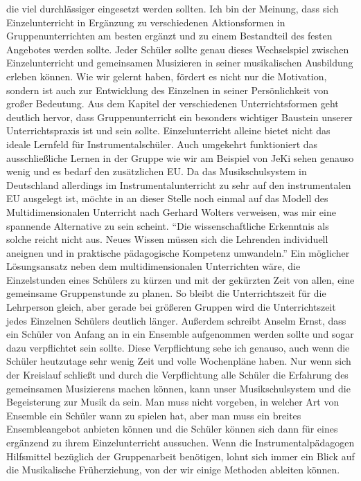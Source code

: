 die viel durchlässiger eingesetzt werden sollten. Ich bin der Meinung, dass sich
Einzelunterricht in Ergänzung zu verschiedenen Aktionsformen in
Gruppenunterrichten am besten ergänzt und zu einem Bestandteil des festen
Angebotes werden sollte. Jeder Schüler sollte genau dieses Wechselspiel zwischen
Einzelunterricht und gemeinsamen Musizieren in seiner musikalischen Ausbildung
erleben können. Wie wir gelernt haben, fördert es nicht nur die Motivation,
sondern ist auch zur Entwicklung des Einzelnen in seiner Persönlichkeit von
großer Bedeutung. Aus dem Kapitel der verschiedenen Unterrichtsformen geht
deutlich hervor, dass Gruppenunterricht ein besonders wichtiger Baustein unserer
Unterrichtspraxis ist und sein sollte. Einzelunterricht alleine bietet nicht das
ideale Lernfeld für Instrumentalschüler. Auch umgekehrt funktioniert das
ausschließliche Lernen in der Gruppe wie wir am Beispiel von JeKi sehen genauso
wenig und es bedarf den zusätzlichen EU. Da das Musikschulsystem in Deutschland
allerdings im Instrumentalunterricht zu sehr auf den instrumentalen EU ausgelegt
ist, möchte in an dieser Stelle noch einmal auf das Modell des
Multidimensionalen Unterricht nach Gerhard Wolters verweisen, was mir eine
spannende Alternative zu sein scheint.
\enquote{Die wissenschaftliche Erkenntnis als solche reicht nicht aus. Neues
Wissen müssen sich die Lehrenden individuell aneignen und in praktische
pädagogische Kompetenz umwandeln.}
\autocite[10]{losert:die_kunst_zu_unterrichten} Ein möglicher Lösungsansatz
neben dem multidimensionalen Unterrichten wäre, die Einzelstunden eines Schülers
zu kürzen und mit der gekürzten Zeit von allen, eine gemeinsame Gruppenstunde zu
planen. So bleibt die Unterrichtszeit für die Lehrperson gleich, aber gerade bei
größeren Gruppen wird die Unterrichtszeit jedes Einzelnen Schülers deutlich
länger.\autocite[33]{losert:die_kunst_zu_unterrichten} Außerdem schreibt Anselm
Ernst, dass ein Schüler von Anfang an in ein Ensemble aufgenommen werden sollte
und sogar dazu verpflichtet sein sollte.
\autocite[61]{ernst:die_zukunftsfaehige_musikschule} Diese Verpflichtung sehe
ich genauso, auch wenn die Schüler heutzutage sehr wenig Zeit und volle
Wochenpläne haben. Nur wenn sich der Kreislauf schließt und durch die
Verpflichtung alle Schüler die Erfahrung des gemeinsamen Musizierens machen
können, kann unser Musikschulsystem und die Begeisterung zur Musik da sein. Man
muss nicht vorgeben, in welcher Art von Ensemble ein Schüler wann zu spielen
hat, aber man muss ein breites Ensembleangebot anbieten können und die Schüler
können sich dann für eines ergänzend zu ihrem Einzelunterricht aussuchen. Wenn
die Instrumentalpädagogen Hilfsmittel bezüglich der Gruppenarbeit benötigen,
lohnt sich immer ein Blick auf die Musikalische Früherziehung, von der wir
einige Methoden ableiten können. 

